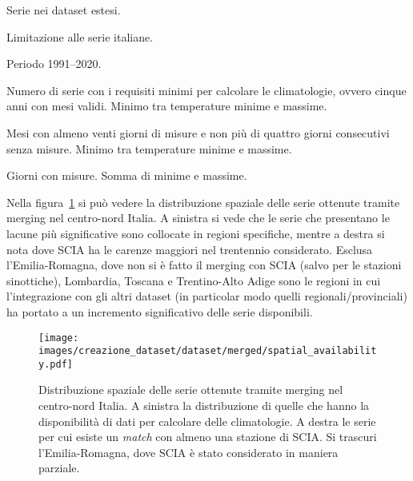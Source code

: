 \begin{table}[ht]
  \centering
  \begin{threeparttable}
    \caption{Serie nei dataset estesi.}\label{tab:series-stats}
    \scriptsize
    
    \begin{tablenotes}
    \item[\dag] Limitazione alle serie italiane.
    \item [*] Periodo 1991--2020.
    \item [1] Numero di serie con i requisiti minimi per calcolare le climatologie, ovvero cinque anni con mesi validi. Minimo tra temperature minime e massime.
    \item [2] Mesi con almeno venti giorni di misure e non più di quattro giorni consecutivi senza misure. Minimo tra temperature minime e massime.
    \item [3] Giorni con misure. Somma di minime e massime.
    \end{tablenotes}
  \end{threeparttable}
\end{table}

Nella figura~\ref{fig:merged-series} si può vedere la distribuzione spaziale delle serie ottenute tramite merging nel centro-nord Italia. A sinistra si vede che le serie che presentano le lacune più significative sono collocate in regioni specifiche, mentre a destra si nota dove SCIA ha le carenze maggiori nel trentennio considerato. Esclusa l'Emilia-Romagna, dove non si è fatto il merging con SCIA (salvo per le stazioni sinottiche), Lombardia, Toscana e Trentino-Alto Adige sono le regioni in cui l'integrazione con gli altri dataset (in particolar modo quelli regionali/provinciali) ha portato a un incremento significativo delle serie disponibili.
\begin{figure}[ht]
  \centering
  \texttt{[image: images/creazione\_dataset/dataset/merged/spatial\_availability.pdf]}
  \caption{Distribuzione spaziale delle serie ottenute tramite merging nel centro-nord Italia. A sinistra la distribuzione di quelle che hanno la disponibilità di dati per calcolare delle climatologie. A destra le serie per cui esiste un \emph{match} con almeno una stazione di SCIA. Si trascuri l'Emilia-Romagna, dove SCIA è stato considerato in maniera parziale.}\label{fig:merged-series}
\end{figure}

